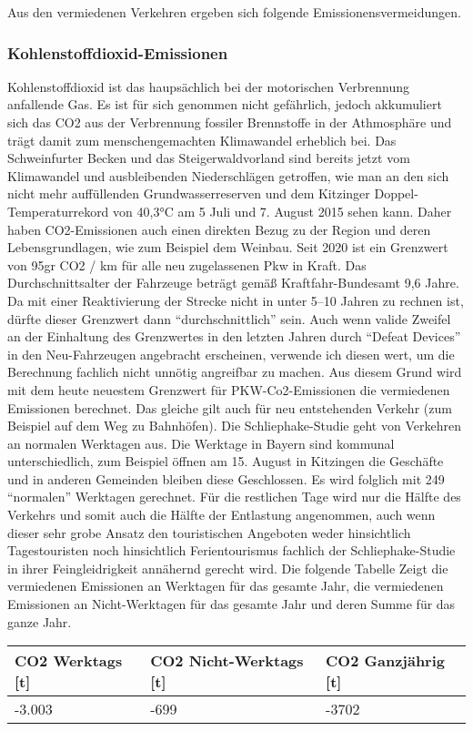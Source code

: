 \documentclass[fontsize=12pt,a4paper]{scrreprt}
\begin{document}
Aus den vermiedenen Verkehren ergeben sich folgende Emissionensvermeidungen.

\subsubsection{Kohlenstoffdioxid-Emissionen}

Kohlenstoffdioxid ist das haupsächlich bei der motorischen Verbrennung anfallende Gas. Es ist für sich genommen nicht gefährlich, jedoch akkumuliert sich das CO2 aus der Verbrennung fossiler Brennstoffe in der Athmosphäre und trägt damit zum menschengemachten Klimawandel erheblich bei.
Das Schweinfurter Becken und das Steigerwaldvorland sind bereits jetzt vom Klimawandel und ausbleibenden Niederschlägen getroffen, wie man an den sich nicht mehr auffüllenden Grundwasserreserven und dem Kitzinger Doppel-Temperaturrekord von 40,3°C am 5 Juli und 7. August 2015 sehen kann.
Daher haben CO2-Emissionen auch einen direkten Bezug zu der Region und deren Lebensgrundlagen, wie zum Beispiel dem Weinbau.
\newline
\newline
Seit 2020 ist ein Grenzwert von 95gr CO2 / km für alle neu zugelassenen Pkw in Kraft. Das Durchschnittsalter der Fahrzeuge beträgt gemäß Kraftfahr-Bundesamt 9,6 Jahre. Da mit einer Reaktivierung der Strecke nicht in unter 5--10 Jahren zu rechnen ist, dürfte dieser Grenzwert dann \enquote{durchschnittlich} sein. Auch wenn valide Zweifel an der Einhaltung des Grenzwertes in den letzten Jahren durch \enquote{Defeat Devices} in den Neu-Fahrzeugen angebracht erscheinen, verwende ich diesen wert, um die Berechnung fachlich nicht unnötig angreifbar zu machen.
Aus diesem Grund wird mit dem heute neuestem Grenzwert für PKW-Co2-Emissionen die vermiedenen Emissionen berechnet. Das gleiche gilt auch für neu entstehenden Verkehr (zum Beispiel auf dem Weg zu Bahnhöfen).
\newline
\newline
Die Schliephake-Studie geht von Verkehren an normalen Werktagen aus. Die Werktage in Bayern sind kommunal unterschiedlich, zum Beispiel öffnen am 15. August in Kitzingen die Geschäfte und in anderen Gemeinden bleiben diese Geschlossen. Es wird folglich mit 249 \enquote{normalen} Werktagen gerechnet. Für die restlichen Tage wird nur die Hälfte des Verkehrs und somit auch die Hälfte der Entlastung angenommen, auch wenn dieser sehr grobe Ansatz den touristischen Angeboten weder hinsichtlich Tagestouristen noch hinsichtlich Ferientourismus fachlich der Schliephake-Studie in ihrer Feingleidrigkeit annähernd gerecht wird.
\newline
\newline
Die folgende Tabelle Zeigt die vermiedenen Emissionen an Werktagen für das gesamte Jahr, die vermiedenen Emissionen an Nicht-Werktagen für das gesamte Jahr und deren Summe für das ganze Jahr.
\newline
\newline
\begin{tabular}{|l|l|l|}
\hline
CO2 Werktags [t] & CO2 Nicht-Werktags [t] & CO2 Ganzjährig [t]\\ 
\hline
-3.003 & -699 & -3702\\ 
\hline
\end{tabular}        
\end{document}
